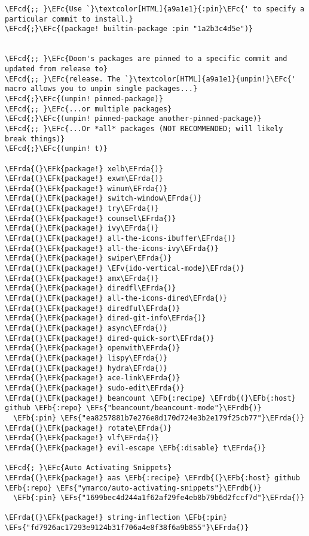\documentclass[a4wide,10pt]{article}
\newcommand{\EFc}[1]{\textcolor{EFc}{#1}} %
\newcommand{\EFcd}[1]{\textcolor{EFcd}{#1}} %
\newcommand{\EFs}[1]{\textcolor{EFs}{#1}} %
\newcommand{\EFk}[1]{\textcolor{EFk}{#1}} %
\newcommand{\EFb}[1]{\textcolor{EFb}{#1}} %
\newcommand{\EFv}[1]{\textcolor{EFv}{#1}} %
\newcommand{\EFrda}[1]{\textcolor{EFrda}{#1}} %
\newcommand{\EFrdb}[1]{\textcolor{EFrdb}{#1}} %
\begin{document}
\begin{Code}
\begin{Verbatim}
\EFcd{;; }\EFc{Use `}\textcolor[HTML]{a9a1e1}{:pin}\EFc{' to specify a particular commit to install.}
\EFcd{;}\EFc{(package! builtin-package :pin "1a2b3c4d5e")}


\EFcd{;; }\EFc{Doom's packages are pinned to a specific commit and updated from release to}
\EFcd{;; }\EFc{release. The `}\textcolor[HTML]{a9a1e1}{unpin!}\EFc{' macro allows you to unpin single packages...}
\EFcd{;}\EFc{(unpin! pinned-package)}
\EFcd{;; }\EFc{...or multiple packages}
\EFcd{;}\EFc{(unpin! pinned-package another-pinned-package)}
\EFcd{;; }\EFc{...Or *all* packages (NOT RECOMMENDED; will likely break things)}
\EFcd{;}\EFc{(unpin! t)}

\EFrda{(}\EFk{package!} xelb\EFrda{)}
\EFrda{(}\EFk{package!} exwm\EFrda{)}
\EFrda{(}\EFk{package!} winum\EFrda{)}
\EFrda{(}\EFk{package!} switch-window\EFrda{)}
\EFrda{(}\EFk{package!} try\EFrda{)}
\EFrda{(}\EFk{package!} counsel\EFrda{)}
\EFrda{(}\EFk{package!} ivy\EFrda{)}
\EFrda{(}\EFk{package!} all-the-icons-ibuffer\EFrda{)}
\EFrda{(}\EFk{package!} all-the-icons-ivy\EFrda{)}
\EFrda{(}\EFk{package!} swiper\EFrda{)}
\EFrda{(}\EFk{package!} \EFv{ido-vertical-mode}\EFrda{)}
\EFrda{(}\EFk{package!} amx\EFrda{)}
\EFrda{(}\EFk{package!} diredfl\EFrda{)}
\EFrda{(}\EFk{package!} all-the-icons-dired\EFrda{)}
\EFrda{(}\EFk{package!} diredful\EFrda{)}
\EFrda{(}\EFk{package!} dired-git-info\EFrda{)}
\EFrda{(}\EFk{package!} async\EFrda{)}
\EFrda{(}\EFk{package!} dired-quick-sort\EFrda{)}
\EFrda{(}\EFk{package!} openwith\EFrda{)}
\EFrda{(}\EFk{package!} lispy\EFrda{)}
\EFrda{(}\EFk{package!} hydra\EFrda{)}
\EFrda{(}\EFk{package!} ace-link\EFrda{)}
\EFrda{(}\EFk{package!} sudo-edit\EFrda{)}
\EFrda{(}\EFk{package!} beancount \EFb{:recipe} \EFrdb{(}\EFb{:host} github \EFb{:repo} \EFs{"beancount/beancount-mode"}\EFrdb{)}
  \EFb{:pin} \EFs{"ea8257881b7e276e8d170d724e3b2e179f25cb77"}\EFrda{)}
\EFrda{(}\EFk{package!} rotate\EFrda{)}
\EFrda{(}\EFk{package!} vlf\EFrda{)}
\EFrda{(}\EFk{package!} evil-escape \EFb{:disable} t\EFrda{)}

\EFcd{; }\EFc{Auto Activating Snippets}
\EFrda{(}\EFk{package!} aas \EFb{:recipe} \EFrdb{(}\EFb{:host} github \EFb{:repo} \EFs{"ymarco/auto-activating-snippets"}\EFrdb{)}
  \EFb{:pin} \EFs{"1699bec4d244a1f62af29fe4eb8b79b6d2fccf7d"}\EFrda{)}

\EFrda{(}\EFk{package!} string-inflection \EFb{:pin} \EFs{"fd7926ac17293e9124b31f706a4e8f38f6a9b855"}\EFrda{)}


\end{Verbatim}
\end{Code}
\end{document}
